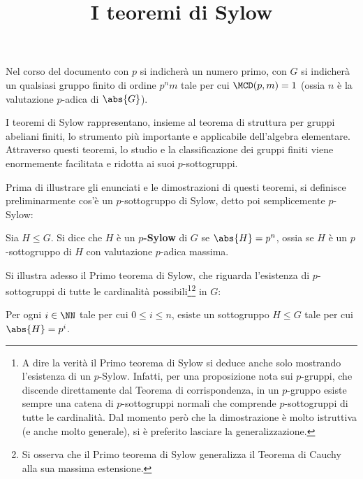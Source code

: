 \documentclass[12pt]{scrartcl}
\begin{document}
	\title{I teoremi di Sylow}
	\maketitle
	
	\begin{note}
		Nel corso del documento con $p$ si indicherà un numero
		primo, con $G$ si indicherà un qualsiasi gruppo finito di ordine $p^n m$ tale per cui $\MCD(p, m) = 1$
		(ossia $n$ è la valutazione $p$-adica di $\abs{G}$).
	\end{note}

	I teoremi di Sylow rappresentano, insieme al teorema di
	struttura per gruppi abeliani finiti, lo strumento più
	importante e applicabile dell'algebra elementare. Attraverso
	questi teoremi, lo studio e la classificazione dei gruppi
	finiti viene enormemente facilitata e ridotta ai suoi
	$p$-sottogruppi. \medskip
	
	
	Prima di illustrare gli enunciati e le dimostrazioni di questi
	teoremi, si definisce preliminarmente cos'è un $p$-sottogruppo
	di Sylow, detto poi semplicemente $p$-Sylow:
	
	\begin{definition}[$p$-Sylow]
		Sia $H \leq G$. Si dice che $H$ è un \textbf{$p$-Sylow}
		di $G$ se $\abs{H} = p^n$, ossia se $H$ è un $p$-sottogruppo
		di $H$ con valutazione $p$-adica massima.
	\end{definition}
	
	Si illustra adesso il Primo teorema di Sylow, che riguarda
	l'esistenza di $p$-sottogruppi di tutte le cardinalità
	possibili\footnote{
		A dire la verità il Primo teorema di Sylow si deduce
		anche solo mostrando l'esistenza di un $p$-Sylow. Infatti,
		per una proposizione nota sui $p$-gruppi, che discende
		direttamente dal Teorema di corrispondenza, in un
		$p$-gruppo esiste sempre
		una catena di $p$-sottogruppi normali che comprende
		$p$-sottogruppi di tutte le cardinalità. Dal momento
		però che la dimostrazione è molto istruttiva (e anche
		molto generale), si è preferito lasciare la generalizzazione.
	}\footnote{
		Si osserva che il Primo teorema di Sylow generalizza il
		Teorema di Cauchy alla sua massima estensione.
	} in $G$:
	
	\begin{theorem}
		Per ogni $i \in \NN$ tale per cui $0 \leq i \leq n$, esiste
		un sottogruppo $H \leq G$ tale per cui $\abs{H} = p^i$.
	\end{theorem}
\end{document}
